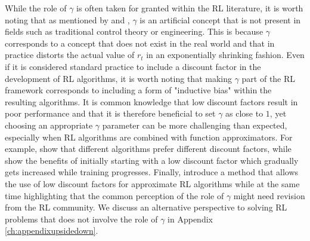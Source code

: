 While the role of $\gamma$ is often taken for granted within the RL literature, it is worth noting that as mentioned by \citet{hessel2019inductive} and \citet{schmidhuber2019reinforcement}, $\gamma$ is an artificial concept that is not present in fields such as traditional control theory or engineering. This is because $\gamma$ corresponds to a concept that does not exist in the real world and that in practice distorts the actual value of $r_t$ in an exponentially shrinking fashion. Even if it is considered standard practice to include a discount factor in the development of RL algorithms, it is worth noting that making $\gamma$ part of the RL framework corresponds to including a form of "inductive bias" within the resulting algorithms. It is common knowledge that low discount factors result in poor performance and that it is therefore beneficial to set $\gamma$ as close to $1$, yet choosing an appropriate $\gamma$ parameter can be more challenging than expected, especially when RL algorithms are combined with function approximators. For example, \citet{wiering2009qv} show that different algorithms prefer different discount factors, while \citet{franccois2015discount} show the benefits of initially starting with a low discount factor which gradually gets increased while training progresses. Finally, \citet{vanseijen2019using} introduce a method that allows the use of low discount factors for approximate RL algorithms while at the same time highlighting that the common perception of the role of $\gamma$ might need revision from the RL community. We discuss an alternative perspective to solving RL problems that does not involve the role of $\gamma$ in Appendix \ref{ch:appendixupsidedown}.             

